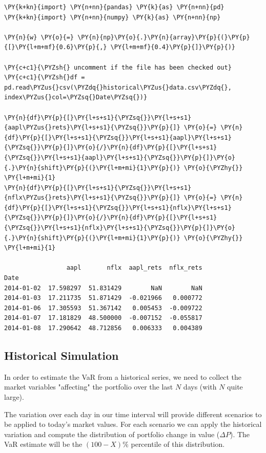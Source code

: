 \begin{codebox}
\begin{Verbatim}[commandchars=\\\{\}]
\PY{k+kn}{import} \PY{n+nn}{pandas} \PY{k}{as} \PY{n+nn}{pd}
\PY{k+kn}{import} \PY{n+nn}{numpy} \PY{k}{as} \PY{n+nn}{np}
	
\PY{n}{w} \PY{o}{=} \PY{n}{np}\PY{o}{.}\PY{n}{array}\PY{p}{(}\PY{p}{[}\PY{l+m+mf}{0.6}\PY{p}{,} \PY{l+m+mf}{0.4}\PY{p}{]}\PY{p}{)}
	
\PY{c+c1}{\PYZsh{} uncomment if the file has been checked out}
\PY{c+c1}{\PYZsh{}df = pd.read\PYZus{}csv(\PYZdq{}historical\PYZus{}data.csv\PYZdq{}, index\PYZus{}col=\PYZsq{}Date\PYZsq{})}
	
\PY{n}{df}\PY{p}{[}\PY{l+s+s1}{\PYZsq{}}\PY{l+s+s1}{aapl\PYZus{}rets}\PY{l+s+s1}{\PYZsq{}}\PY{p}{]} \PY{o}{=} \PY{n}{df}\PY{p}{[}\PY{l+s+s1}{\PYZsq{}}\PY{l+s+s1}{aapl}\PY{l+s+s1}{\PYZsq{}}\PY{p}{]}\PY{o}{/}\PY{n}{df}\PY{p}{[}\PY{l+s+s1}{\PYZsq{}}\PY{l+s+s1}{aapl}\PY{l+s+s1}{\PYZsq{}}\PY{p}{]}\PY{o}{.}\PY{n}{shift}\PY{p}{(}\PY{l+m+mi}{1}\PY{p}{)} \PY{o}{\PYZhy{}} \PY{l+m+mi}{1}
\PY{n}{df}\PY{p}{[}\PY{l+s+s1}{\PYZsq{}}\PY{l+s+s1}{nflx\PYZus{}rets}\PY{l+s+s1}{\PYZsq{}}\PY{p}{]} \PY{o}{=} \PY{n}{df}\PY{p}{[}\PY{l+s+s1}{\PYZsq{}}\PY{l+s+s1}{nflx}\PY{l+s+s1}{\PYZsq{}}\PY{p}{]}\PY{o}{/}\PY{n}{df}\PY{p}{[}\PY{l+s+s1}{\PYZsq{}}\PY{l+s+s1}{nflx}\PY{l+s+s1}{\PYZsq{}}\PY{p}{]}\PY{o}{.}\PY{n}{shift}\PY{p}{(}\PY{l+m+mi}{1}\PY{p}{)} \PY{o}{\PYZhy{}} \PY{l+m+mi}{1}

                 aapl       nflx  aapl_rets  nflx_rets
Date
2014-01-02  17.598297  51.831429        NaN        NaN
2014-01-03  17.211735  51.871429  -0.021966   0.000772
2014-01-06  17.305593  51.367142   0.005453  -0.009722
2014-01-07  17.181829  48.500000  -0.007152  -0.055817
2014-01-08  17.290642  48.712856   0.006333   0.004389
\end{Verbatim}
\end{codebox}

\subsection{Historical Simulation}\label{historical-simulation}

In order to estimate the VaR from a historical series, we need to
collect the market variables "affecting" the portfolio over the last $N$ days 
(with $N$ quite large).

The variation over each day in our time interval will provide different
scenarios to be applied to today's market values.
For each scenario we can apply the historical variation and compute the distribution of portfolio change in value (\(\Delta P\)). 
The VaR estimate will be the $(100 - X)\%$ percentile of this distribution. 

